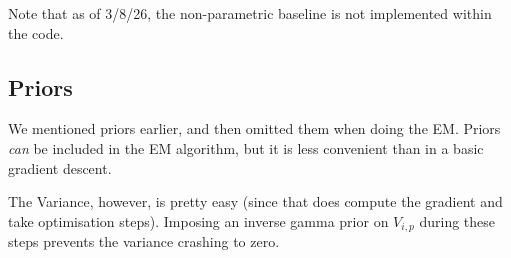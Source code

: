 		\begin{aside}
			Note that as of 3/8/26, the non-parametric baseline is not implemented within the code.
		\end{aside}

\subsection{Priors}

	We mentioned priors earlier, and then omitted them when doing the EM. Priors \textit{can} be included in the EM algorithm, but it is less convenient than in a basic gradient descent.

	The Variance, however, is pretty easy (since that does compute the gradient and take optimisation steps). Imposing an inverse gamma prior on $V_{i,p}$ during these steps prevents the variance crashing to zero.



